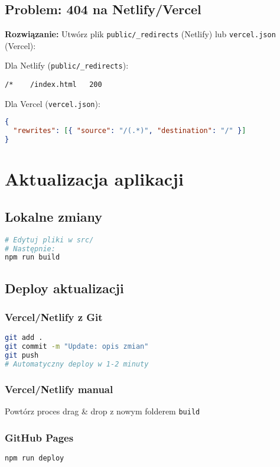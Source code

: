 \documentclass[12pt,a4paper]{article}
\begin{document}
\subsection{Problem: 404 na Netlify/Vercel}
\textbf{Rozwiązanie:}
Utwórz plik \texttt{public/\_redirects} (Netlify) lub \texttt{vercel.json} (Vercel):

Dla Netlify (\texttt{public/\_redirects}):
\begin{lstlisting}
/*    /index.html   200
\end{lstlisting}

Dla Vercel (\texttt{vercel.json}):
\begin{lstlisting}[language=json]
{
  "rewrites": [{ "source": "/(.*)", "destination": "/" }]
}
\end{lstlisting}

\section{Aktualizacja aplikacji}

\subsection{Lokalne zmiany}
\begin{lstlisting}[language=bash]
# Edytuj pliki w src/
# Następnie:
npm run build
\end{lstlisting}

\subsection{Deploy aktualizacji}

\subsubsection{Vercel/Netlify z Git}
\begin{lstlisting}[language=bash]
git add .
git commit -m "Update: opis zmian"
git push
# Automatyczny deploy w 1-2 minuty
\end{lstlisting}

\subsubsection{Vercel/Netlify manual}
Powtórz proces drag \& drop z nowym folderem \texttt{build}

\subsubsection{GitHub Pages}
\begin{lstlisting}[language=bash]
npm run deploy
\end{lstlisting}
\end{document}
